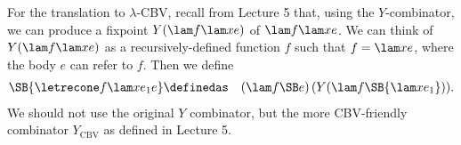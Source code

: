 For the translation to $\lambda$-CBV, recall from Lecture 5 that, using the $Y$-combinator, we can produce a fixpoint $Y(\lam f{\lam xe})$ of $\lam f{\lam xe}$. We can think of $Y(\lam f{\lam xe})$ as a recursively-defined function $f$ such that $f=\lam xe$, where the body $e$ can refer to $f$. Then we define
\begin{eqnarray*}
\SB{\letrecone f{\lam x{e_1}}e} &\definedas& (\lam f{\SB e})\,(Y(\lam f{\SB{\lam x{e_1}}})) .
\end{eqnarray*}
We should not use the original $Y$ combinator, but the more CBV-friendly combinator $Y_{\mathrm{CBV}}$ as defined in Lecture 5.

